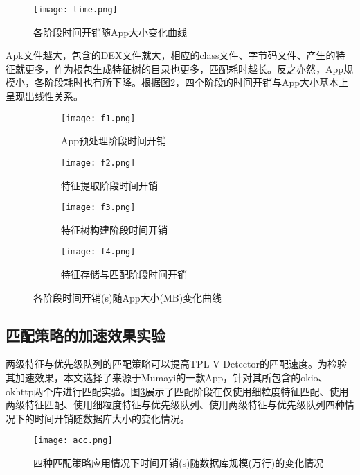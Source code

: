\begin{figure}[!htp]
  \centering
  \texttt{[image: time.png]} \\
  \caption{各阶段时间开销随App大小变化曲线}
 \label{fig:flow}
\end{figure}


Apk文件越大，包含的DEX文件就大，相应的class文件、字节码文件、产生的特征就更多，作为根包生成特征树的目录也更多，匹配耗时越长。反之亦然，App规模小，各阶段耗时也有所下降。根据图\ref{fig:four}，四个阶段的时间开销与App大小基本上呈现出线性关系。

\begin{figure}[!htp]
  \centering
  \begin{subfigure}{0.4\textwidth}
    \centering
    \texttt{[image: f1.png]}
    \caption{App预处理阶段时间开销}
  \end{subfigure}
  \hspace{1cm}
  \begin{subfigure}{0.4\textwidth}
    \centering
    \texttt{[image: f2.png]}
    \caption{特征提取阶段时间开销}
  \end{subfigure}
  \vfill
  \begin{subfigure}{0.4\textwidth}
    \centering
    \texttt{[image: f3.png]}
    \caption{特征树构建阶段时间开销}
  \end{subfigure}
  \hspace{1cm}
  \begin{subfigure}{0.4\textwidth}
    \centering
    \texttt{[image: f4.png]}
    \caption{特征存储与匹配阶段时间开销}
  \end{subfigure}
  \caption{各阶段时间开销(s)随App大小(MB)变化曲线}
  \label{fig:four}
\end{figure}


\subsection{匹配策略的加速效果实验}

两级特征与优先级队列的匹配策略可以提高TPL-V Detector的匹配速度。为检验其加速效果，本文选择了来源于Mumayi\cite{mumayi}的一款App，针对其所包含的okio、okhttp两个库进行匹配实验。图\ref{fig:acc}展示了匹配阶段在仅使用细粒度特征匹配、使用两级特征匹配、使用细粒度特征与优先级队列、使用两级特征与优先级队列四种情况下的时间开销随数据库大小的变化情况。

\begin{figure}[!htp]
  \centering
  \texttt{[image: acc.png]} \\
  \caption{四种匹配策略应用情况下时间开销(s)随数据库规模(万行)的变化情况}
 \label{fig:acc}
\end{figure}

